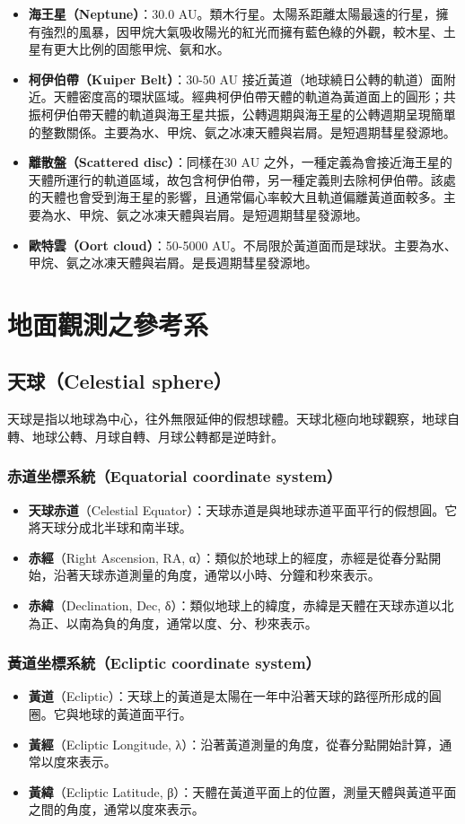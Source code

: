 \documentclass[a4paper,12pt]{report}
\begin{document}
\begin{itemize}
    \item \textbf{海王星（Neptune）}：30.0 AU。類木行星。太陽系距離太陽最遠的行星，擁有強烈的風暴，因甲烷大氣吸收陽光的紅光而擁有藍色綠的外觀，較木星、土星有更大比例的固態甲烷、氨和水。
    \item \textbf{柯伊伯帶（Kuiper Belt）}：30-50 AU 接近黃道（地球繞日公轉的軌道）面附近。天體密度高的環狀區域。經典柯伊伯帶天體的軌道為黃道面上的圓形；共振柯伊伯帶天體的軌道與海王星共振，公轉週期與海王星的公轉週期呈現簡單的整數關係。主要為水、甲烷、氨之冰凍天體與岩屑。是短週期彗星發源地。
    \item \textbf{離散盤（Scattered disc）}：同樣在30 AU 之外，一種定義為會接近海王星的天體所運行的軌道區域，故包含柯伊伯帶，另一種定義則去除柯伊伯帶。該處的天體也會受到海王星的影響，且通常偏心率較大且軌道偏離黃道面較多。主要為水、甲烷、氨之冰凍天體與岩屑。是短週期彗星發源地。
    \item \textbf{歐特雲（Oort cloud）}：50-5000 AU。不局限於黃道面而是球狀。主要為水、甲烷、氨之冰凍天體與岩屑。是長週期彗星發源地。
\end{itemize}
\section{地面觀測之參考系}
\subsection{天球（Celestial sphere）}
天球是指以地球為中心，往外無限延伸的假想球體。天球北極向地球觀察，地球自轉、地球公轉、月球自轉、月球公轉都是逆時針。
\bct\bfH\ctr{}\ef\FB\ect
\subsubsection{赤道坐標系統（Equatorial coordinate system）}
\begin{itemize}
    \item \textbf{天球赤道}（Celestial Equator）：天球赤道是與地球赤道平面平行的假想圓。它將天球分成北半球和南半球。
    \item \textbf{赤經}（Right Ascension, RA, α）：類似於地球上的經度，赤經是從春分點開始，沿著天球赤道測量的角度，通常以小時、分鐘和秒來表示。
    \item \textbf{赤緯}（Declination, Dec, δ）：類似地球上的緯度，赤緯是天體在天球赤道以北為正、以南為負的角度，通常以度、分、秒來表示。
\end{itemize}
\subsubsection{黃道坐標系統（Ecliptic coordinate system）}
\begin{itemize}
    \item \textbf{黃道}（Ecliptic）：天球上的黃道是太陽在一年中沿著天球的路徑所形成的圓圈。它與地球的黃道面平行。
    \item \textbf{黃經}（Ecliptic Longitude, λ）：沿著黃道測量的角度，從春分點開始計算，通常以度來表示。
    \item \textbf{黃緯}（Ecliptic Latitude, β）：天體在黃道平面上的位置，測量天體與黃道平面之間的角度，通常以度來表示。
\end{itemize}
\end{document}
